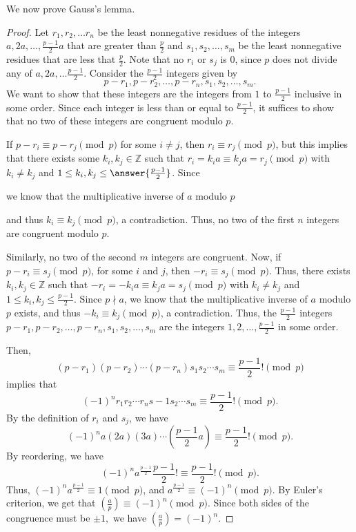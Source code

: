 \documentclass{ximera}
\theoremstyle{definition}
\begin{document}
We now prove Gauss's lemma.
\begin{proof}
 Let $r_1,r_2,\dots r_n$ be the least nonnegative residues of the integers $a,2a,\dots,\frac{p-1}{2}a$ that are greater than $\frac{p}{2}$ and $s_1,s_2,\dots,s_m$ be the least nonnegative residues that are less that $\frac{p}{2}$. Note that no $r_i$ or $s_j$ is 0, since $p$ does not divide any of $a,2a,\dots \frac{p-1}{2}$. Consider the $\frac{p-1}{2}$ integers given by \[p-r_1,p-r_2,\dots,p-r_n,s_1,s_2,\dots,s_m.\]
 We want to show that these integers are the integers from $1$ to $\frac{p-1}{2}$ inclusive in some order. Since each integer is less than or equal to $\frac{p-1}{2}$, it suffices to show that no two of these integers are congruent modulo $p$. 
 
If $p-r_i\equiv p-r_j \pmod p$ for some $i\neq j$, then $r_i\equiv r_j \pmod p$, but this implies that there exists some $k_i,k_j\in\mathbb{Z}$ such that $r_i=k_ia\equiv k_ja=r_j\pmod p$ with $k_i\neq k_j$ and $1\leq k_i,k_j\leq\answer{\frac{p-1}{2}}
$. Since 
\begin{multipleChoice}
\end{multipleChoice}
 we know that the multiplicative inverse of $a$ modulo $p$ 
\begin{multipleChoice}
\end{multipleChoice}
 and thus $k_i\equiv k_j \pmod p$, a contradiction. Thus, no two of the first $n$ integers are congruent modulo $p$. 
 
 Similarly, no two of the second $m$ integers are congruent. Now, if $p-r_i\equiv s_j \pmod p$, for some $i$ and $j$, then $-r_i\equiv s_j \pmod p$. Thus, there exists $k_i,k_j\in\mathbb{Z}$ such that $-r_i=-k_ia\equiv k_ja=s_j\pmod p$ with $k_i\neq k_j$ and $1\leq k_i,k_j\leq\frac{p-1}{2}$. Since $p\nmid a$, we know that the multiplicative inverse of $a$ modulo $p$ exists, and thus $-k_i\equiv k_j \pmod p$, a contradiction.
Thus, the $\frac{p-1}{2}$ integers $p-r_1,p-r_2,\dots,p-r_n,s_1,s_2,\dots,s_m$ are the integers $1,2,\dots,\frac{p-1}{2}$ in some order. 

Then, \[(p-r_1)(p-r_2)\cdots(p-r_n)s_1s_2\cdots s_m\equiv\frac{p-1}{2}! \pmod p\]
implies that \[(-1)^nr_1r_2\cdots r_ns-1s_2\cdots s_m\equiv\frac{p-1}{2}! \pmod p.\]
By the definition of $r_i$ and $s_j$, we have 
\[(-1)^na(2a)(3a)\cdots(\frac{p-1}{2}a)\equiv\frac{p-1}{2}! \pmod p.\]
By reordering, we have 
\[(-1)^na^{\frac{p-1}{2}}\frac{p-1}{2}!\equiv\frac{p-1}{2}! \pmod p.\]
Thus, $(-1)^na^{\frac{p-1}{2}}\equiv 1 \pmod p$, and $a^{\frac{p-1}{2}}\equiv (-1)^n \pmod p$. By Euler's criterion, we get that $\left(\frac{a}{p}\right)\equiv(-1)^n \pmod p$. Since both sides of the congruence must be $\pm1,$ we have $\left(\frac{a}{p}\right)=(-1)^n $.
\end{proof}
\end{document}
